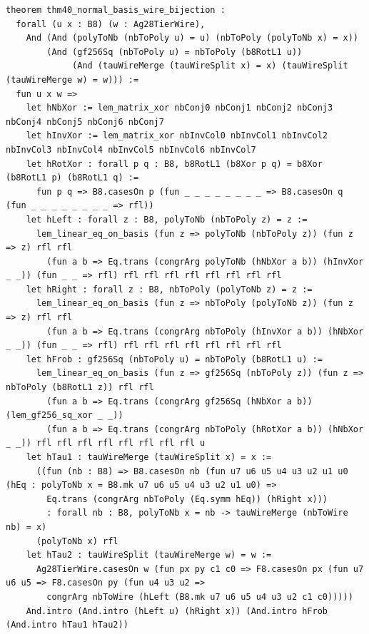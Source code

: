 \documentclass[11pt,letterpaper]{article}
\theoremstyle{spectralthm}
\begin{document}
\begin{lstlisting}[language=Lean4,caption={Standalone Pure Init.Prelude Term-Mode Lean 4 Kernel Suite (thm30--thm61, v0.0.0, 0 sorry, 0 axioms).},label={lst:lean_unified}]
theorem thm40_normal_basis_wire_bijection :
  forall (u x : B8) (w : Ag28TierWire),
    And (And (polyToNb (nbToPoly u) = u) (nbToPoly (polyToNb x) = x))
        (And (gf256Sq (nbToPoly u) = nbToPoly (b8RotL1 u))
             (And (tauWireMerge (tauWireSplit x) = x) (tauWireSplit (tauWireMerge w) = w))) :=
  fun u x w =>
    let hNbXor := lem_matrix_xor nbConj0 nbConj1 nbConj2 nbConj3 nbConj4 nbConj5 nbConj6 nbConj7
    let hInvXor := lem_matrix_xor nbInvCol0 nbInvCol1 nbInvCol2 nbInvCol3 nbInvCol4 nbInvCol5 nbInvCol6 nbInvCol7
    let hRotXor : forall p q : B8, b8RotL1 (b8Xor p q) = b8Xor (b8RotL1 p) (b8RotL1 q) :=
      fun p q => B8.casesOn p (fun _ _ _ _ _ _ _ _ => B8.casesOn q (fun _ _ _ _ _ _ _ _ => rfl))
    let hLeft : forall z : B8, polyToNb (nbToPoly z) = z :=
      lem_linear_eq_on_basis (fun z => polyToNb (nbToPoly z)) (fun z => z) rfl rfl
        (fun a b => Eq.trans (congrArg polyToNb (hNbXor a b)) (hInvXor _ _)) (fun _ _ => rfl) rfl rfl rfl rfl rfl rfl rfl rfl
    let hRight : forall z : B8, nbToPoly (polyToNb z) = z :=
      lem_linear_eq_on_basis (fun z => nbToPoly (polyToNb z)) (fun z => z) rfl rfl
        (fun a b => Eq.trans (congrArg nbToPoly (hInvXor a b)) (hNbXor _ _)) (fun _ _ => rfl) rfl rfl rfl rfl rfl rfl rfl rfl
    let hFrob : gf256Sq (nbToPoly u) = nbToPoly (b8RotL1 u) :=
      lem_linear_eq_on_basis (fun z => gf256Sq (nbToPoly z)) (fun z => nbToPoly (b8RotL1 z)) rfl rfl
        (fun a b => Eq.trans (congrArg gf256Sq (hNbXor a b)) (lem_gf256_sq_xor _ _))
        (fun a b => Eq.trans (congrArg nbToPoly (hRotXor a b)) (hNbXor _ _)) rfl rfl rfl rfl rfl rfl rfl rfl u
    let hTau1 : tauWireMerge (tauWireSplit x) = x :=
      ((fun (nb : B8) => B8.casesOn nb (fun u7 u6 u5 u4 u3 u2 u1 u0 (hEq : polyToNb x = B8.mk u7 u6 u5 u4 u3 u2 u1 u0) =>
        Eq.trans (congrArg nbToPoly (Eq.symm hEq)) (hRight x)))
        : forall nb : B8, polyToNb x = nb -> tauWireMerge (nbToWire nb) = x)
      (polyToNb x) rfl
    let hTau2 : tauWireSplit (tauWireMerge w) = w :=
      Ag28TierWire.casesOn w (fun px py c1 c0 => F8.casesOn px (fun u7 u6 u5 => F8.casesOn py (fun u4 u3 u2 =>
        congrArg nbToWire (hLeft (B8.mk u7 u6 u5 u4 u3 u2 c1 c0)))))
    And.intro (And.intro (hLeft u) (hRight x)) (And.intro hFrob (And.intro hTau1 hTau2))


\end{lstlisting}
\end{document}
